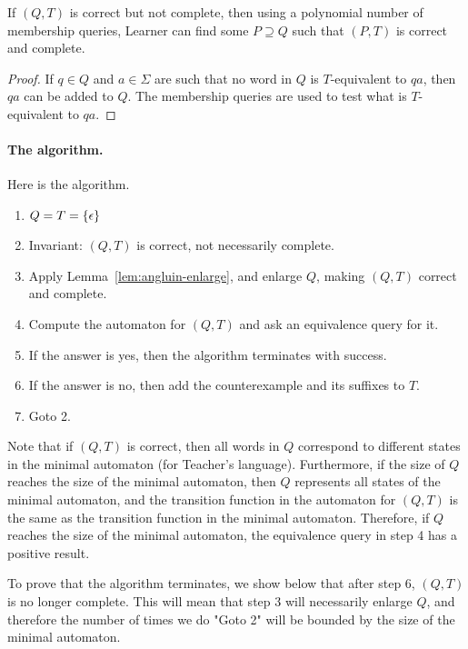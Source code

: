\begin{lemma}\label{lem:angluin-enlarge}
 If $(Q,T)$ is correct but not complete, then using a polynomial number of membership queries, Learner can find some $P \supseteq Q$ such that $(P,T)$ is correct and complete.	
\end{lemma}
\begin{proof}
If $q \in Q$ and $a \in \Sigma$ are such that no word in $Q$ is $T$-equivalent to $qa$, then $qa$ can be added to $Q$. The membership queries are used to test what is $T$-equivalent to $qa$. 	
\end{proof}




\paragraph*{The algorithm.} Here is  the algorithm.

\begin{enumerate}
	\item $Q=T= \{\epsilon\}$
 \item Invariant: $(Q,T)$ is correct, not necessarily complete.
\item  Apply Lemma~\ref{lem:angluin-enlarge}, and enlarge $Q$, making $(Q,T)$ correct and complete.
\item  Compute the automaton for $(Q,T)$ and ask an equivalence query for it.
\item If the answer is yes, then the algorithm terminates with success.
\item If the answer is no, then add the counterexample and its suffixes to $T$.
\item Goto 2.
\end{enumerate}



Note that if $(Q,T)$ is correct, then all words in $Q$ correspond to different states in the minimal automaton (for Teacher's language). Furthermore, if the size of $Q$ reaches the size of the minimal automaton, then $Q$ represents all states of the minimal automaton, and the transition function in the automaton for $(Q,T)$ is the same as the transition function in the minimal automaton. Therefore, if $Q$ reaches the size of the minimal automaton, the equivalence query in step 4 has a positive result.

To prove that the algorithm terminates, we show  below that after step 6, $(Q,T)$ is no longer complete. This will mean that step 3 will necessarily enlarge $Q$, and therefore the number of times we do "Goto 2" will be bounded by the size of the minimal automaton.

